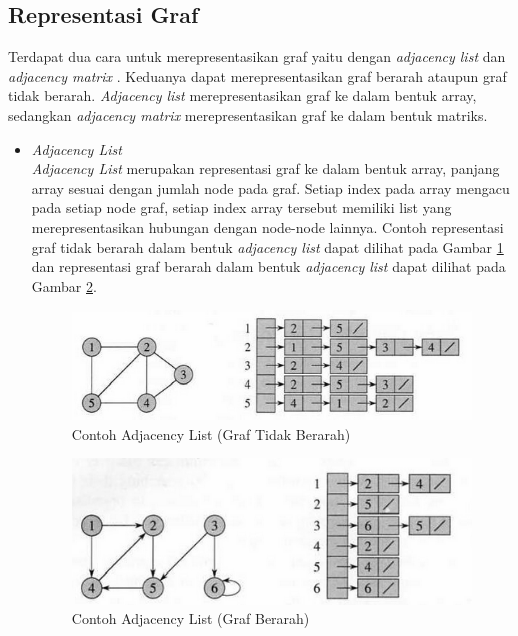 \subsection{Representasi Graf}
Terdapat dua cara untuk merepresentasikan graf yaitu dengan \textit{adjacency
list} dan \textit{adjacency matrix} \cite{Cormen:2001}. Keduanya dapat
merepresentasikan graf berarah ataupun graf tidak berarah. \textit{Adjacency list} merepresentasikan
graf ke dalam bentuk array, sedangkan \textit{adjacency matrix}
merepresentasikan graf ke dalam bentuk matriks.
\begin{itemize}
  \item \textit{Adjacency List}\\
  \textit{Adjacency List} merupakan representasi graf ke dalam bentuk array,
  panjang array sesuai dengan jumlah node pada graf. Setiap index pada array
  mengacu pada setiap node graf, setiap index array tersebut memiliki list yang
  merepresentasikan hubungan dengan node-node lainnya. Contoh representasi graf
  tidak berarah dalam bentuk \textit{adjacency list} dapat dilihat pada Gambar 
  \ref{fig:adjlist_undirec} dan representasi graf berarah
  dalam bentuk \textit{adjacency list} dapat dilihat pada Gambar
  \ref{fig:adjlist_direc}.
  
\begin{figure}[h]
\centering
\includegraphics[scale=1]{Gambar/adjlist_undirec}
\caption[Contoh Adjacency List]{Contoh Adjacency List (Graf Tidak Berarah)}
\label{fig:adjlist_undirec}
\end{figure}

\begin{figure}[h]
\centering
\includegraphics[scale=1]{Gambar/adjlist_direc}
\caption[Contoh Adjacency List]{Contoh Adjacency List (Graf Berarah)}
\label{fig:adjlist_direc}
\end{figure}
  

\end{itemize}
